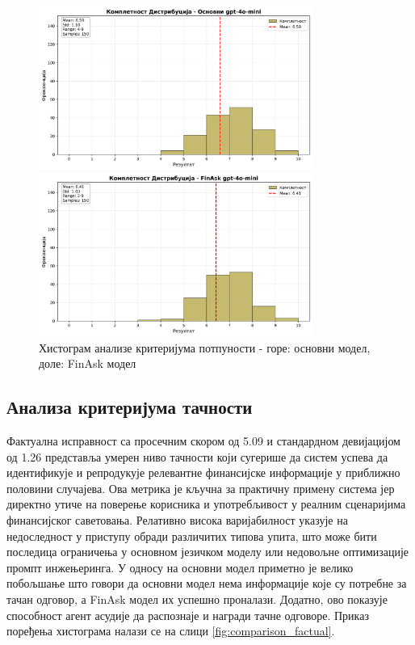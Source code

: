\begin{figure}[h]
    \centering
    \includegraphics[width=0.8\textwidth]{images/osnovni/criteria_analysis_completeness_histogram.png}
    
    \vspace{0.5cm}
    
    \includegraphics[width=0.8\textwidth]{images/FinAsk/criteria_analysis_completeness_histogram.png}
    \caption{Хистограм анализе критеријума потпуности - горе: основни модел, доле: FinAsk модел}
    \label{fig:comparison_completeness}
\end{figure}

\subsection{Анализа критеријума тачности}

Фактуална исправност са просечним скором од 5.09 и стандардном девијацијом од 1.26 представља умерен ниво тачности који сугерише да систем успева да идентификује и репродукује релевантне финансијске информације у приближно половини случајева. Ова метрика је кључна за практичну примену система јер директно утиче на поверење корисника и употребљивост у реалним сценаријима финансијског саветовања. Релативно висока варијабилност указује на недоследност у приступу обради различитих типова упита, што може бити последица ограничења у основном језичком моделу или недовољне оптимизације промпт инжењеринга. У односу на основни модел приметно је велико побољшање што говори да основни модел нема информације које су потребне за тачан одговор, а FinAsk модел их успешно проналази. Додатно, ово показује способност агент асудије да распознаје и награди тачне одговоре. Приказ поређења хистограма налази се на слици \ref{fig:comparison_factual}.


